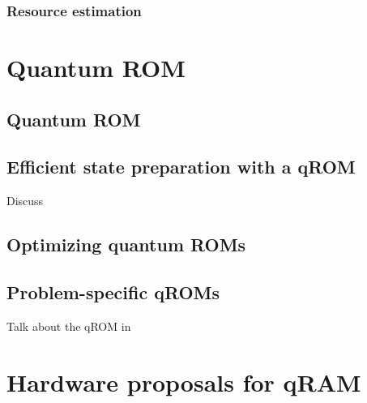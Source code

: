 \documentclass[a4paper,12pt]{article}
\begin{document}
\subsubsection{Resource estimation}



\section{Quantum ROM}
\label{sec:circuits}

\subsection{Quantum ROM}

\subsection{Efficient state preparation with a qROM}

Discuss \cite{Vadym2018}

\subsection{Optimizing quantum ROMs}

\subsection{Problem-specific qROMs}

Talk about the qROM in \cite{Babbush2018}

\section{Hardware proposals for qRAM}
\label{sec:hardware}
\end{document}
